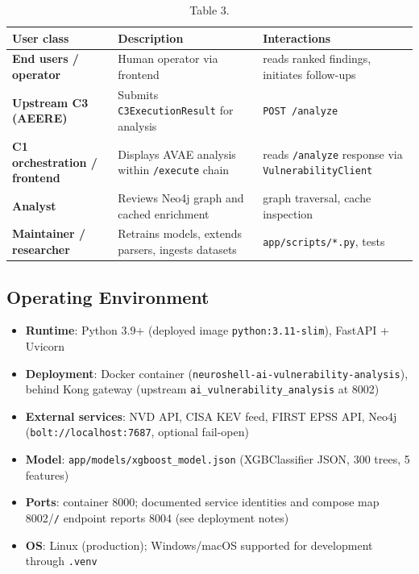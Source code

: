 \documentclass[10pt,journal,onecolumn]{IEEEtran}
\begin{document}
\begin{table}[h]
\caption{Table 3.}
\label{tab:t3}
\begin{tabularx}{\columnwidth}{l >{\raggedright\arraybackslash}X >{\raggedright\arraybackslash}X}
\toprule
\textbf{User class} & \textbf{Description} & \textbf{Interactions}\\
\midrule
\textbf{End users / operator} & Human operator via frontend & reads ranked findings, initiates follow-ups\\
\textbf{Upstream C3 (AEERE)} & Submits \texttt{C3ExecutionResult} for analysis & \texttt{POST /analyze}\\
\textbf{C1 orchestration / frontend} & Displays AVAE analysis within \texttt{/execute} chain & reads \texttt{/analyze} response via \texttt{VulnerabilityClient}\\
\textbf{Analyst} & Reviews Neo4j graph and cached enrichment & graph traversal, cache inspection\\
\textbf{Maintainer / researcher} & Retrains models, extends parsers, ingests datasets & \texttt{app/scripts/*.py}, tests\\
\bottomrule
\end{tabularx}
\end{table}

\subsection{Operating Environment}

\begin{itemize}
\item \textbf{Runtime}: Python 3.9+ (deployed image \texttt{python:3.11-slim}), FastAPI + Uvicorn
\item \textbf{Deployment}: Docker container (\texttt{neuroshell-\allowbreak ai-\allowbreak vulnerability-\allowbreak analysis}), behind Kong gateway (upstream \texttt{ai\_\allowbreak vulnerability\_\allowbreak analysis} at 8002)
\item \textbf{External services}: NVD API, CISA KEV feed, FIRST EPSS API, Neo4j (\texttt{bolt://localhost:7687}, optional fail-open)
\item \textbf{Model}: \texttt{app/\allowbreak models/\allowbreak xgboost\_\allowbreak model.\allowbreak json} (XGBClassifier JSON, 300 trees, 5 features)
\item \textbf{Ports}: container 8000; documented service identities and compose map 8002/\texttt{/} endpoint reports 8004 (see deployment notes)
\item \textbf{OS}: Linux (production); Windows/macOS supported for development through \texttt{.venv}
\end{itemize}
\end{document}
